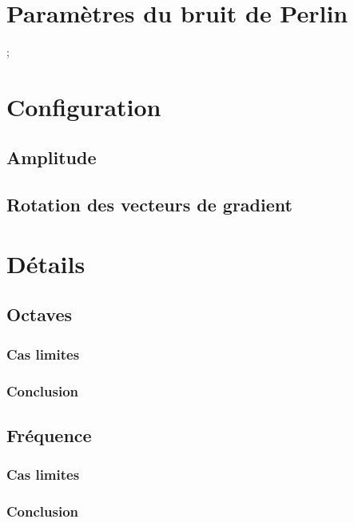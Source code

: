 \section{Paramètres du bruit de Perlin};

\section{Configuration}

\subsection{Amplitude}

\subsection{Rotation des vecteurs de gradient}

\section{Détails}

\subsection{Octaves}

\subsubsection{Cas limites}

\subsubsection{Conclusion}

\subsection{Fréquence}

\subsubsection{Cas limites}

\subsubsection{Conclusion}



